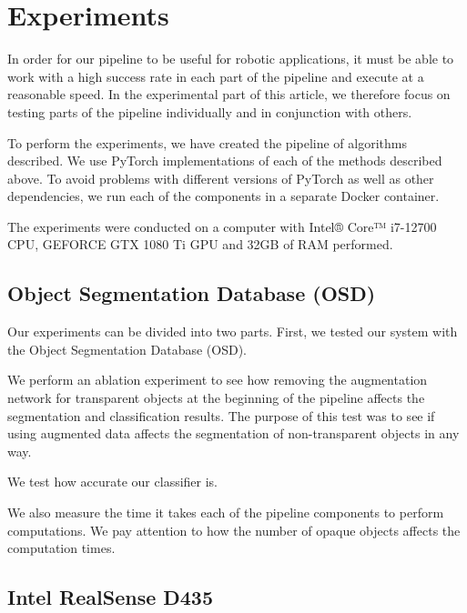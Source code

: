 \documentclass[10pt,twocolumn,letterpaper]{article}
\begin{document}


\section{Experiments}
In order for our pipeline to be useful for robotic applications, it must be able to work with a high success rate in each part of the pipeline and execute at a reasonable speed. In the experimental part of this article, we therefore focus on testing parts of the pipeline individually and in conjunction with others.

To perform the experiments, we have created the pipeline of algorithms described. We use PyTorch \cite{Paszke_Gross_Massa_Lerer_Bradbury_Chanan_Killeen_Lin_Gimelshein_Antiga_et} implementations \cite{UOIS-git} \cite{resnet-Pytorch} of each of the methods described above. To avoid problems with different versions of PyTorch as well as other dependencies, we run each of the components in a separate Docker container.

The experiments were conducted on a computer with Intel® Core™ i7-12700 CPU,
GEFORCE GTX 1080 Ti GPU and 32GB of RAM performed.

\subsection{Object Segmentation Database (OSD)}

Our experiments can be divided into two parts. First, we tested our system with the Object Segmentation Database (OSD).

We perform an ablation experiment to see how removing the augmentation network for transparent objects at the beginning of the pipeline affects the segmentation and classification results. The purpose of this test was to see if using augmented data affects the segmentation of non-transparent objects in any way.

We test how accurate our classifier is.

We also measure the time it takes each of the pipeline components to perform computations. We pay attention to how the number of opaque objects affects the computation times.

\subsection{Intel RealSense D435}
\end{document}
